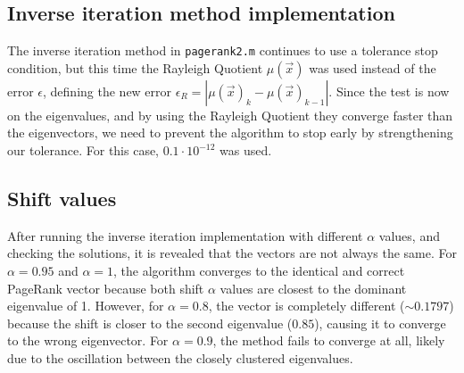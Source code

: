 \documentclass[unicode,11pt,a4paper,oneside,numbers=endperiod,openany]{scrartcl}
\begin{document}
\subsection{Inverse iteration method implementation}
The inverse iteration method in \texttt{pagerank2.m} continues to use a tolerance stop condition, but this time the Rayleigh Quotient $\mu(\vec{x})$ was used instead of the error $\epsilon$, defining the new error $\epsilon_R = |\mu(\vec{x})_k - \mu(\vec{x})_{k - 1}|$. Since the test is now on the eigenvalues, and by using the Rayleigh Quotient they converge faster than the eigenvectors, we need to prevent the algorithm to stop early by strengthening our tolerance. For this case, $0.1 \cdot 10^{-12}$ was used.
\subsection{Shift values}
After running the inverse iteration implementation with different $\alpha$ values, and checking the solutions, it is revealed that the vectors are not always the same. For $\alpha = 0.95$ and $\alpha = 1$, the algorithm converges to the identical and correct PageRank vector because both shift $\alpha$ values are closest to the dominant eigenvalue of 1. However, for $\alpha = 0.8$, the vector is completely different ($\sim0.1797$) because the shift is closer to the second eigenvalue ($0.85$), causing it to converge to the wrong eigenvector. For $\alpha = 0.9$, the method fails to converge at all, likely due to the oscillation between the closely clustered eigenvalues.
\end{document}
